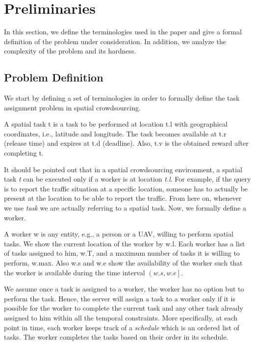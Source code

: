 \section{Preliminaries}

In this section, we define the terminologies used in the paper and give a formal definition of the problem under consideration. In addition, we analyze the complexity of the problem and its hardness.

\subsection{Problem Definition}
\label{subsec:problemdef}

We start by defining a set of terminologies in order to formally define the task assignment problem in spatial crowdsourcing.

\begin{definition} 
A spatial task t is a task to be performed at location t.l with geographical coordinates, i.e., latitude and longitude. The task becomes available at t.r (release time) and expires at t.d (deadline). Also, t.v is the obtained reward after completing t.
\end{definition}

It should be pointed out that in a spatial crowdsourcing environment, a spatial task \emph{t} can be executed only if a worker is at location \emph{t.l}. For example, if the query is to report the traffic situation at a specific location, someone has to actually be present at the location to be able to report the traffic. From here on, whenever we use \emph{task} we are actually referring to a spatial task. Now, we formally define a worker.

\begin{definition} [Worker]
A worker w is any entity, e.g., a person or a UAV, willing to perform spatial tasks. We show the current location of the worker by w.l. Each worker has a list of tasks assigned to him, w.T, and a maximum number of tasks it is willing to perform, w.max. Also w.s and w.e show the availability of the worker such that the worker is available during the time interval $\left( w.s, w.e \right]$.
\end{definition}

We assume once a task is assigned to a worker, the worker has no option but to perform the task. Hence, the server will assign a task to a worker only if it is possible for the worker to complete the current task and any other task already assigned to him within all the temporal constraints. More specifically, at each point in time, each worker keeps track of a \textit{schedule} which is an ordered list of tasks. The worker completes the tasks based on their order in its schedule.

